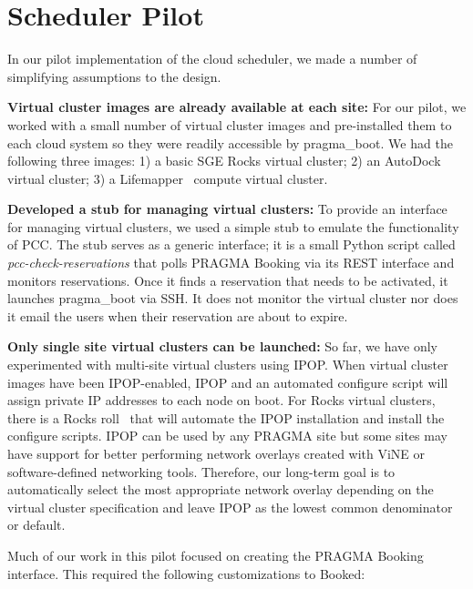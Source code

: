 \documentclass[times]{cpeauth}
\begin{document}
\section{Scheduler Pilot}
\label{Sec:Pilot}

In our pilot implementation of the cloud scheduler, we made a number of simplifying assumptions to the design.

\textbf{Virtual cluster images are already available at each site:}  For our pilot, we worked with a small number of virtual cluster images and pre-installed them to each cloud system so they were readily accessible by pragma\_boot.  We had the following three images: 1) a basic SGE Rocks virtual cluster; 2) an AutoDock virtual cluster;  3) a Lifemapper~\cite{lifemapper} compute virtual cluster.   

\textbf{Developed a stub for managing virtual clusters:}  To provide an interface for managing virtual clusters, we used a simple stub to emulate the functionality of PCC.  The stub serves as a generic interface; it is a small Python script called \textit{pcc-check-reservations} that polls PRAGMA Booking via its REST interface and monitors reservations.  Once it finds a reservation that needs to be activated, it launches pragma\_boot via SSH.  It does not  monitor the virtual cluster nor does it email the users when their reservation are about to expire.  

\textbf{Only single site virtual clusters can be launched:}  So far, we have only experimented with multi-site virtual clusters using IPOP.  When virtual cluster images have been IPOP-enabled, IPOP and an automated configure script will assign private IP addresses to each node on boot.  For Rocks virtual clusters, there is a Rocks roll~\cite{ipoproll} that will automate the IPOP installation and install the configure scripts.  IPOP can be used by any PRAGMA site but some sites may have support for better performing network overlays created with ViNE or software-defined networking tools.  Therefore, our long-term goal is to automatically select the most appropriate network overlay depending on the virtual cluster specification and leave IPOP as the lowest common denominator or default.

Much of our work in this pilot focused on creating the PRAGMA Booking interface.  This required the following customizations to Booked:
\end{document}
